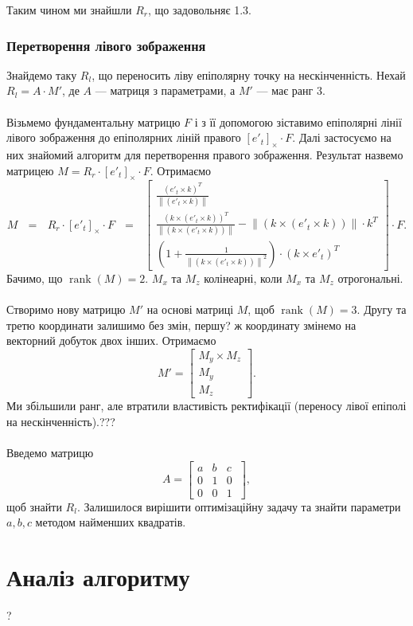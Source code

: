 Таким чином ми знайшли $R_r$, що задовольняє 1.3.
\\
\indent

\subsubsection{Перетворення лівого зображення}
Знайдемо таку $R_l$, що переносить ліву епіполярну точку на нескінченність. 
Нехай $R_l = A \cdot M'$, де $A$ --- матриця з параметрами, а $M'$ --- має ранг 
3.
\\\\
\indent
Візьмемо фундаментальну матрицю $F$ і з її допомогою зіставимо епіполярні лінії
лівого зображення до епіполярних ліній правого ${[{e'}_t]}_\times \cdot F$. 
Далі застосуємо на них знайомий алгоритм для перетворення правого зображення. 
Результат назвемо матрицею $M = R_r \cdot {[{e'}_t]}_\times \cdot F$. Отримаємо
\begin{equation}
M \:\:\: = \:\:\: R_r \cdot {[{e'}_t]}_\times \cdot F \:\:\: = \:\:\:
\left[
\begin{matrix}
\frac{{({e'}_t \times k)}^T}
{\left \| ({e'}_t \times k) \right \|}\\
\frac{{(k \times ({e'}_t \times k))}^T}
{\left \| (k \times ({e'}_t \times k)) \right \|} 
- \left \| (k \times ({e'}_t \times k)) \right \| \cdot k^T\\
(1 + \frac{1}{{\left \| (k \times ({e'}_t \times k)) \right \|}^2}) \cdot {(k \times {e'}_t)}^T\
\end{matrix}
\right]
\cdot F.
\end{equation}
Бачимо, що $\operatorname{rank}(M) = 2$. $M_x$ та $M_z$ колінеарні, 
коли $M_x$ та $M_z$ отрогональні.
\\\\
\indent
Створимо нову матрицю $M'$ на основі матриці $M$, щоб 
$\operatorname{rank}(M) = 3$. Другу та третю координати залишимо без 
змін, першу? ж координату змінемо на векторний добуток двох інших. 
Отримаємо
\begin{equation}
    M' =
    \left[
    \begin{matrix}
    M_y \times M_z\\
    M_y\\
    M_z\
    \end{matrix}
    \right].
\end{equation}
Ми збільшили ранг, але втратили властивість ректифікації (переносу 
лівої епіполі
на нескінченність).???
\\\\
\indent
Введемо матрицю 
\begin{equation}
    A =
    \left[
    \begin{matrix}
    a & b & c\\
    0 & 1 & 0\\
    0 & 0 & 1\
    \end{matrix}
    \right],
\end{equation}
щоб знайти $R_l$. Залишилося вирішити оптимізаційну задачу та знайти параметри 
$a, b, c$ методом найменших квадратів.  











\section{Аналіз алгоритму}
?